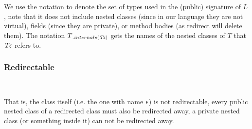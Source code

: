 \begin{defs}
	
\end{defs}

We use the notation  to denote the set of types used in the (public) signature of $L$, note that it does not include nested classes (since in our language they are not virtual),  fields (since they are private), or method bodies (as redirect will delete them). The notation $T{{}_{.{internals}({\mathit{Tz}})}}$ gets the names of the nested classes of $T$ that $\mathit{Tz}$ refers to. 

\subsubsection{Redirectable}
\noindent\\ 

\begin{defs}
\end{defs}
That is, the class itself (i.e. the one with name $\epsilon$) is not redirectable, every public nested class of a redirected class must also be redirected away, a private nested class (or something inside it) can not be redirected away.

